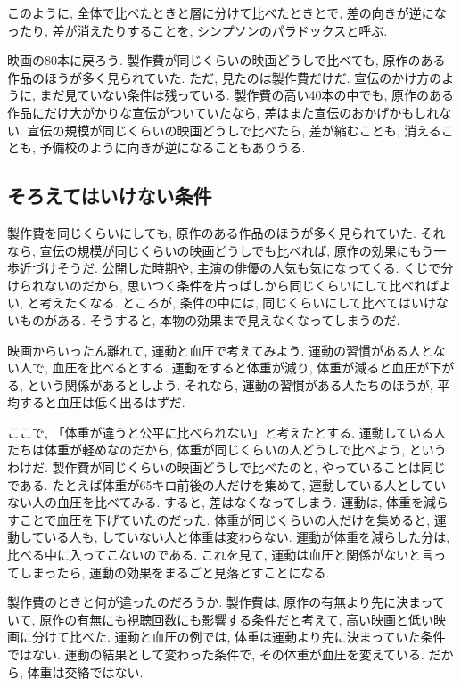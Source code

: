     このように, 全体で比べたときと層に分けて比べたときとで, 差の向きが逆になったり, 差が消えたりすることを, シンプソンのパラドックスと呼ぶ.

    映画の80本に戻ろう.
    製作費が同じくらいの映画どうしで比べても, 原作のある作品のほうが多く見られていた.
    ただ, 見たのは製作費だけだ.
    宣伝のかけ方のように, まだ見ていない条件は残っている.
    製作費の高い40本の中でも, 原作のある作品にだけ大がかりな宣伝がついていたなら, 差はまた宣伝のおかげかもしれない.
    宣伝の規模が同じくらいの映画どうしで比べたら, 差が縮むことも, 消えることも, 予備校のように向きが逆になることもありうる.

  \subsection{そろえてはいけない条件}

    製作費を同じくらいにしても, 原作のある作品のほうが多く見られていた.
    それなら, 宣伝の規模が同じくらいの映画どうしでも比べれば, 原作の効果にもう一歩近づけそうだ.
    公開した時期や, 主演の俳優の人気も気になってくる.
    くじで分けられないのだから, 思いつく条件を片っぱしから同じくらいにして比べればよい, と考えたくなる.
    ところが, 条件の中には, 同じくらいにして比べてはいけないものがある.
    そうすると, 本物の効果まで見えなくなってしまうのだ.

    映画からいったん離れて, 運動と血圧で考えてみよう.
    運動の習慣がある人とない人で, 血圧を比べるとする.
    運動をすると体重が減り, 体重が減ると血圧が下がる, という関係があるとしよう.
    それなら, 運動の習慣がある人たちのほうが, 平均すると血圧は低く出るはずだ.

    ここで, 「体重が違うと公平に比べられない」と考えたとする.
    運動している人たちは体重が軽めなのだから, 体重が同じくらいの人どうしで比べよう, というわけだ.
    製作費が同じくらいの映画どうしで比べたのと, やっていることは同じである.
    たとえば体重が65キロ前後の人だけを集めて, 運動している人としていない人の血圧を比べてみる.
    すると, 差はなくなってしまう.
    運動は, 体重を減らすことで血圧を下げていたのだった.
    体重が同じくらいの人だけを集めると, 運動している人も, していない人と体重は変わらない.
    運動が体重を減らした分は, 比べる中に入ってこないのである.
    これを見て, 運動は血圧と関係がないと言ってしまったら, 運動の効果をまるごと見落とすことになる.

    製作費のときと何が違ったのだろうか.
    製作費は, 原作の有無より先に決まっていて, 原作の有無にも視聴回数にも影響する条件だと考えて, 高い映画と低い映画に分けて比べた.
    運動と血圧の例では, 体重は運動より先に決まっていた条件ではない.
    運動の結果として変わった条件で, その体重が血圧を変えている.
    だから, 体重は交絡ではない.

